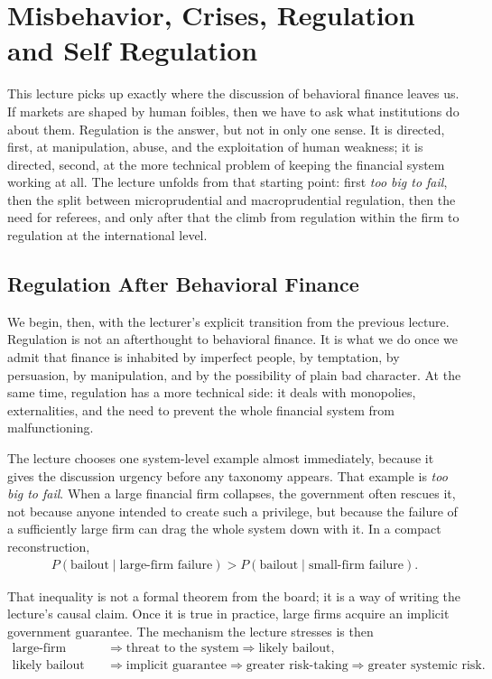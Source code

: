 \chapter{Misbehavior, Crises, Regulation and Self Regulation}

This lecture picks up exactly where the discussion of behavioral finance leaves us. If markets are shaped by human foibles, then we have to ask what institutions do about them. Regulation is the answer, but not in only one sense. It is directed, first, at manipulation, abuse, and the exploitation of human weakness; it is directed, second, at the more technical problem of keeping the financial system working at all. The lecture unfolds from that starting point: first \emph{too big to fail}, then the split between microprudential and macroprudential regulation, then the need for referees, and only after that the climb from regulation within the firm to regulation at the international level.

\section{Regulation After Behavioral Finance}

We begin, then, with the lecturer's explicit transition from the previous lecture. Regulation is not an afterthought to behavioral finance. It is what we do once we admit that finance is inhabited by imperfect people, by temptation, by persuasion, by manipulation, and by the possibility of plain bad character. At the same time, regulation has a more technical side: it deals with monopolies, externalities, and the need to prevent the whole financial system from malfunctioning.

The lecture chooses one system-level example almost immediately, because it gives the discussion urgency before any taxonomy appears. That example is \emph{too big to fail}. When a large financial firm collapses, the government often rescues it, not because anyone intended to create such a privilege, but because the failure of a sufficiently large firm can drag the whole system down with it. In a compact reconstruction,
\begin{align}
P(\text{bailout}\mid \text{large-firm failure})
>
P(\text{bailout}\mid \text{small-firm failure}).
\end{align}

That inequality is not a formal theorem from the board; it is a way of writing the lecture's causal claim. Once it is true in practice, large firms acquire an implicit government guarantee. The mechanism the lecture stresses is then
\begin{align}
\text{large-firm failure}
&\Rightarrow
\text{threat to the system}
\Rightarrow
\text{likely bailout},\\
\text{likely bailout}
&\Rightarrow
\text{implicit guarantee}
\Rightarrow
\text{greater risk-taking}
\Rightarrow
\text{greater systemic risk}.
\end{align}

